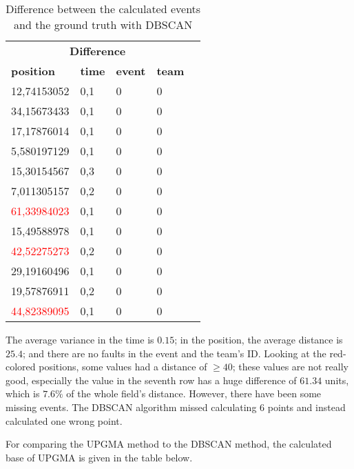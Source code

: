 \begin{table}[H]
    \begin{center}
		\begin{tabular}{|l|l|l|l|l}
			\hline
            \multicolumn{4}{|c|}{\large \textbf{Difference}} \\
			\hhline{====}
			\textbf{position} & \textbf{time} & \textbf{event} & \textbf{team} \\
			\hline
			12,74153052 & 0,1 & 0 & 0\\
			\hline
			34,15673433 & 0,1 & 0 & 0\\
			\hline
			17,17876014 & 0,1 & 0 & 0\\
			\hline
			5,580197129 & 0,1 & 0 & 0\\
			\hline
			15,30154567 & 0,3 & 0 & 0\\
			\hline
			7,011305157 & 0,2 & 0 & 0\\
			\hline
			\textcolor{red}{61,33984023} & 0,1 & 0 & 0\\
			\hline
			15,49588978 & 0,1 & 0 & 0\\
			\hline
			\textcolor{red}{42,52275273} & 0,2 & 0 & 0\\
			\hline
			29,19160496 & 0,1 & 0 & 0\\
			\hline
			19,57876911 & 0,2 & 0 & 0\\
			\hline
			\textcolor{red}{44,82389095} & 0,1 & 0 & 0\\
			\hline
		\end{tabular}
    \end{center}
    \caption{Difference between the calculated events and the ground truth with DBSCAN}
\end{table}

The average variance in the time is $0.15$; in the position, the average distance is $25.4$; and there are no faults in the event and the team's ID.
Looking at the red-colored positions, some values had a distance of $\ge 40$; these values are not really good, especially the value in the seventh row has a huge difference of $61.34$ units, which is $7.6\%$ of the whole field's distance.
However, there have been some missing events. The DBSCAN algorithm missed calculating 6 points and instead calculated one wrong point.

For comparing the UPGMA method to the DBSCAN method, the calculated base of UPGMA is given in the table below.

